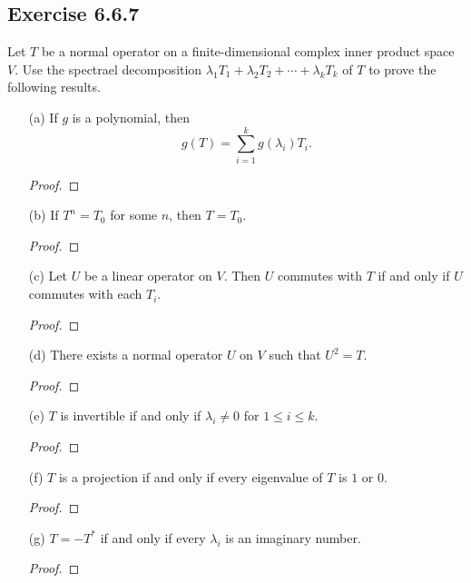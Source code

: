 \subsection*{Exercise 6.6.7} Let \( T  \) be a normal operator on a finite-dimensional complex inner product space \( V  \). Use the spectrael decomposition \( {\lambda}_{1} {T}_{1} + {\lambda}_{2} {T}_{2} + \cdots + {\lambda}_{k} {T}_{k} \) of \( T  \) to prove the following results.
\begin{enumerate}
    \item[(a)] If \( g \) is a polynomial, then 
        \[  g(T) = \sum_{ i=1  }^{ k  } g({\lambda}_{i}) {T}_{i}. \]
        \begin{proof}
        
        \end{proof}
    \item[(b)] If \( T^{n} = {T}_{0} \) for some \( n  \), then \( T = {T}_{0} \). 
        \begin{proof}
        
        \end{proof}
    \item[(c)] Let \( U  \) be a linear operator on \( V  \). Then \( U  \) commutes with \( T  \) if and only if \( U  \) commutes with each \( {T}_{i} \). 
        \begin{proof}
        
        \end{proof}
    \item[(d)] There exists a normal operator \( U  \) on \( V  \) such that \( U^{2} = T  \).
        \begin{proof}
        
        \end{proof}
    \item[(e)] \( T  \) is invertible if and only if \( {\lambda}_{i} \neq 0  \) for \( 1 \leq i \leq k  \).
        \begin{proof}
        
        \end{proof}
    \item[(f)] \( T  \) is a projection if and only if every eigenvalue of \( T  \) is \( 1  \) or \( 0  \).
        \begin{proof}
        
        \end{proof}
    \item[(g)] \( T = - T^{*} \) if and only if every \( {\lambda}_{i} \) is an imaginary number.
        \begin{proof}
        
        \end{proof}
\end{enumerate}
